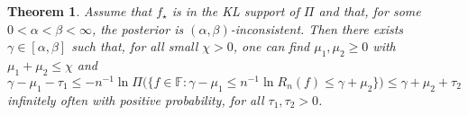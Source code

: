 \documentclass[11pt,twoside]{article}
\newtheorem{theorem}{Theorem}
\def\FF{\mathbb{F}}
\def\FF{\mathbb{F}}
\begin{document}
\begin{theorem}\label{thm:alpha_beta_inconsistency}
    Assume that $f_\star$ is in the KL support of $\Pi$ and that, for some $0<\alpha < \beta<\infty$, the posterior is $(\alpha,\beta)$-inconsistent. Then there exists $\gamma\in[\alpha,\beta]$ such that, for all small $\chi>0$, one can find $\mu_1,\mu_2\geq 0$ with $\mu_1+\mu_2\leq \chi$ and
    \begin{equation}\label{eq:theorem_alpha_beta_inconsistency}
        \gamma - \mu_1 - \tau_1 \leq -n^{-1}\ln\Pi\big(\big\{f\in\FF : \gamma-\mu_1 \leq n^{-1}\ln R_n(f)\leq \gamma + \mu_2\big\}\big) \leq \gamma + \mu_2 + \tau_2
    \end{equation}
    infinitely often with positive probability, for all $\tau_1,\tau_2>0$.
\end{theorem}
\end{document}
